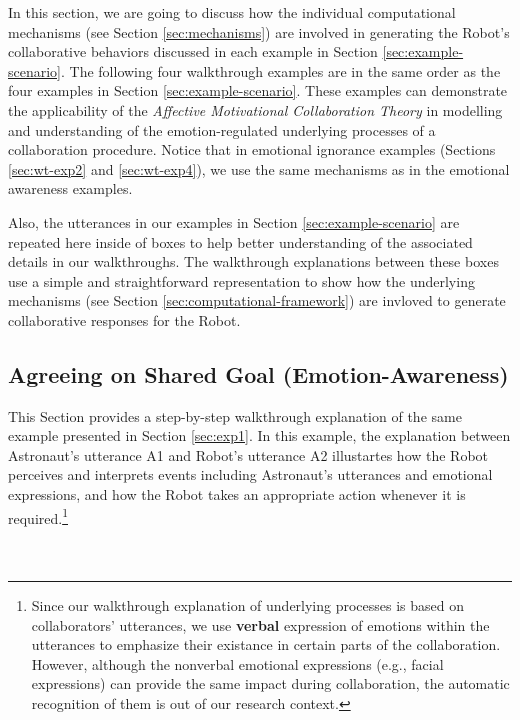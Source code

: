 In this section, we are going to discuss how the individual computational
mechanisms (see Section \ref{sec:mechanisms}) are involved in generating the
Robot's collaborative behaviors discussed in each example in Section
\ref{sec:example-scenario}. The following four walkthrough examples are in the
same order as the four examples in Section \ref{sec:example-scenario}. These
examples can demonstrate the applicability of the \textit{Affective Motivational
Collaboration Theory} in modelling and understanding of the emotion-regulated
underlying processes of a collaboration procedure. Notice that in emotional
ignorance examples (Sections \ref{sec:wt-exp2} and \ref{sec:wt-exp4}), we use
the same mechanisms as in the emotional awareness examples.

Also, the utterances in our examples in Section \ref{sec:example-scenario} are
repeated here inside of boxes to help better understanding of the associated
details in our walkthroughs. The walkthrough explanations between these boxes
use a simple and straightforward representation to show how the underlying
mechanisms (see Section \ref{sec:computational-framework}) are invloved to
generate collaborative responses for the Robot.

\subsection{Agreeing on Shared Goal (Emotion-Awareness)}
\label{sec:wt-exp1}

This Section provides a step-by-step walkthrough explanation of the same
example presented in Section \ref{sec:exp1}. In this example, the explanation
between Astronaut's utterance A1 and Robot's utterance A2 illustartes how the
Robot perceives and interprets events including Astronaut's utterances and
emotional expressions, and how the Robot takes an appropriate action whenever it
is required.\footnote{Since our walkthrough explanation of underlying processes
is based on collaborators' utterances, we use \textbf{verbal} expression of
emotions within the utterances to emphasize their existance in certain parts of
the collaboration. However, although the nonverbal emotional expressions (e.g.,
facial expressions) can provide the same impact during collaboration, the
automatic recognition of them is out of our research context.}\\

\noindent{}\\ \\

